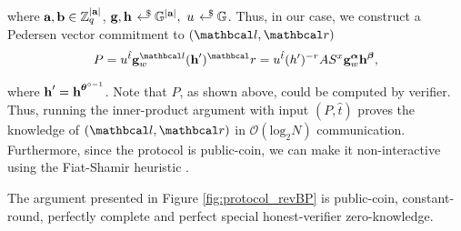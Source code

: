   \noindent where $\textbf{a}, \textbf{b} \in \mathbb{Z}_q^{|\textbf{a}|}$, $\textbf{g}, \textbf{h} \rgen \G^{|\textbf{a}|}, \ u \rgen \G$.
  Thus, in our case, we construct a Pedersen vector commitment to $(\lvec, \rvec)$
  \begin{align*}
    P = u^{\hat{t}} \textbf{g}^{\lvec}_w (\textbf{h}^{\prime})^\rvec = u^{\hat{t}} (h^{\prime})^{-r} AS^{x} \textbf{g}^{\vecnb{\alpha}}_w \textbf{h}^{\vecnb{\beta}},
  \end{align*}
  
  \noindent where $\textbf{h}^{\prime} = \textbf{h}^{{\boldsymbol{\theta}}^{\circ -1}}$. 
  Note that $P$, as shown above, could be computed by verifier. 
  Thus, running the inner-product argument with input $(P, \hat{t})$ proves the knowledge of $(\lvec, \rvec)$ in $\mathcal{O}( \text{log}_2N )$ communication.
  Furthermore, since the \proto protocol is public-coin, we can make it non-interactive using the Fiat-Shamir heuristic \cite{FiatShamir86}.\\[-2pt]
  
  
  
  \begin{theorem}
  The argument presented in Figure \ref{fig:protocol_revBP} is public-coin, constant-round, perfectly complete and perfect special honest-verifier zero-knowledge.
  \end{theorem}
  
